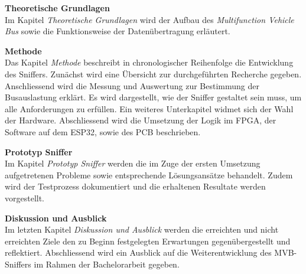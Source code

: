 \textbf{Theoretische Grundlagen}\\
Im Kapitel \textit{Theoretische Grundlagen} wird der Aufbau des \textit{Multifunction Vehicle Bus} sowie die Funktionsweise der Datenübertragung erläutert.

\textbf{Methode}\\
Das Kapitel \textit{Methode} beschreibt in chronologischer Reihenfolge die Entwicklung des Sniffers. Zunächst wird eine Übersicht zur durchgeführten Recherche gegeben. Anschliessend wird die Messung und Auswertung zur Bestimmung der Busauslastung erklärt. Es wird dargestellt, wie der Sniffer gestaltet sein muss, um alle Anforderungen zu erfüllen. Ein weiteres Unterkapitel widmet sich der Wahl der Hardware. Abschliessend wird die Umsetzung der Logik im FPGA, der Software auf dem ESP32, sowie des PCB beschrieben.

\textbf{Prototyp Sniffer}\\
Im Kapitel \textit{Prototyp Sniffer} werden die im Zuge der ersten Umsetzung aufgetretenen Probleme sowie entsprechende Lösungsansätze behandelt. Zudem wird der Testprozess dokumentiert und die erhaltenen Resultate werden vorgestellt.

\textbf{Diskussion und Ausblick}\\
Im letzten Kapitel \textit{Diskussion und Ausblick} werden die erreichten und nicht erreichten Ziele den zu Beginn festgelegten Erwartungen gegenübergestellt und reflektiert. Abschliessend wird ein Ausblick auf die Weiterentwicklung des MVB-Sniffers im Rahmen der Bachelorarbeit gegeben.

